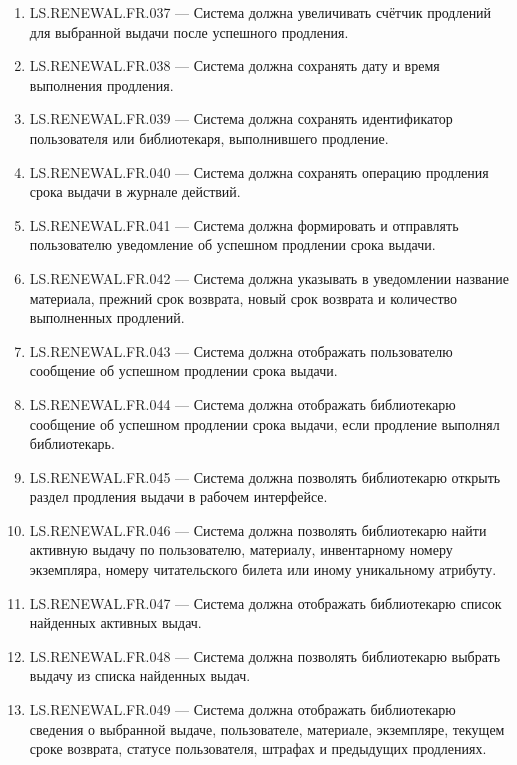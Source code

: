 \documentclass[12pt,a4paper]{article}
\begin{document}
\begin{enumerate}
		\item LS.RENEWAL.FR.037 --- Система должна увеличивать счётчик продлений для
		выбранной выдачи после успешного продления.
		
		\item LS.RENEWAL.FR.038 --- Система должна сохранять дату и время выполнения
		продления.
		
		\item LS.RENEWAL.FR.039 --- Система должна сохранять идентификатор пользователя
		или библиотекаря, выполнившего продление.
		
		\item LS.RENEWAL.FR.040 --- Система должна сохранять операцию продления срока
		выдачи в журнале действий.
		
		\item LS.RENEWAL.FR.041 --- Система должна формировать и отправлять пользователю
		уведомление об успешном продлении срока выдачи.
		
		\item LS.RENEWAL.FR.042 --- Система должна указывать в уведомлении название
		материала, прежний срок возврата, новый срок возврата и количество выполненных
		продлений.
		
		\item LS.RENEWAL.FR.043 --- Система должна отображать пользователю сообщение
		об успешном продлении срока выдачи.
		
		\item LS.RENEWAL.FR.044 --- Система должна отображать библиотекарю сообщение
		об успешном продлении срока выдачи, если продление выполнял библиотекарь.
		
		\item LS.RENEWAL.FR.045 --- Система должна позволять библиотекарю открыть раздел
		продления выдачи в рабочем интерфейсе.
		
		\item LS.RENEWAL.FR.046 --- Система должна позволять библиотекарю найти активную
		выдачу по пользователю, материалу, инвентарному номеру экземпляра, номеру
		читательского билета или иному уникальному атрибуту.
		
		\item LS.RENEWAL.FR.047 --- Система должна отображать библиотекарю список найденных
		активных выдач.
		
		\item LS.RENEWAL.FR.048 --- Система должна позволять библиотекарю выбрать выдачу
		из списка найденных выдач.
		
		\item LS.RENEWAL.FR.049 --- Система должна отображать библиотекарю сведения
		о выбранной выдаче, пользователе, материале, экземпляре, текущем сроке возврата,
		статусе пользователя, штрафах и предыдущих продлениях.
		

\end{enumerate}
\end{document}
